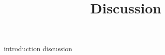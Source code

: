 \documentclass[10pt]{article}
\title{Discussion}
\date{}
\author{}
\begin{document}
\maketitle


{introduction}
\newpage
{discussion}

% 

\end{document}
